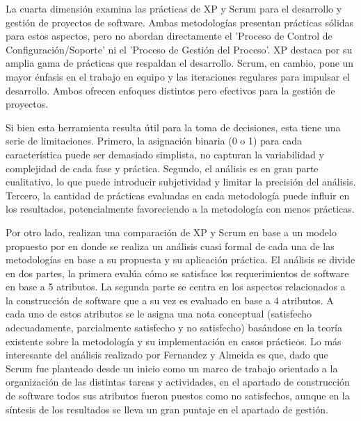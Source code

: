 \documentclass[a4paper,10pt]{article}
\begin{document}
	La cuarta dimensión examina las prácticas de XP y Scrum para el desarrollo y gestión de proyectos de software. Ambas metodologías presentan prácticas sólidas para estos aspectos, pero no abordan directamente el 'Proceso de Control de Configuración/Soporte' ni el 'Proceso de Gestión del Proceso'. XP destaca por su amplia gama de prácticas que respaldan el desarrollo. Scrum, en cambio, pone un mayor énfasis en el trabajo en equipo y las iteraciones regulares para impulsar el desarrollo. Ambos ofrecen enfoques distintos pero efectivos para la gestión de proyectos.
	
	Si bien esta herramienta resulta útil para la toma de decisiones, esta tiene una serie de limitaciones. Primero, la asignación binaria (0 o 1) para cada característica puede ser demasiado simplista, no capturan la variabilidad y complejidad de cada fase y práctica. Segundo, el análisis es en gran parte cualitativo, lo que puede introducir subjetividad y limitar la precisión del análisis. Tercero, la cantidad de prácticas evaluadas en cada metodología puede influir en los resultados, potencialmente favoreciendo a la metodología con menos prácticas.
	
	Por otro lado, \textcite{fernandes2010classification} realizan una comparación de XP y Scrum en base a un modelo propuesto por \textcite{sol1983feature} en donde se realiza un análisis cuasi formal de cada una de las metodologías en base a su propuesta y su aplicación práctica. El análisis se divide en dos partes, la primera evalúa cómo se satisface los requerimientos de software en base a 5 atributos. La segunda parte se centra en los aspectos relacionados a la construcción de software que a su vez es evaluado en base a 4 atributos. A cada uno de estos atributos se le asigna una nota conceptual (satisfecho adecuadamente, parcialmente satisfecho y no satisfecho) basándose en la teoría existente sobre la metodología y su implementación en casos prácticos. Lo más interesante del análisis realizado por Fernandez y Almeida es que, dado que Scrum fue planteado desde un inicio como un marco de trabajo orientado a la organización de las distintas tareas y actividades, en el apartado de construcción de software todos sus atributos fueron puestos como no satisfechos, aunque en la síntesis de los resultados se lleva un gran puntaje en el apartado de gestión.
	
\end{document}
